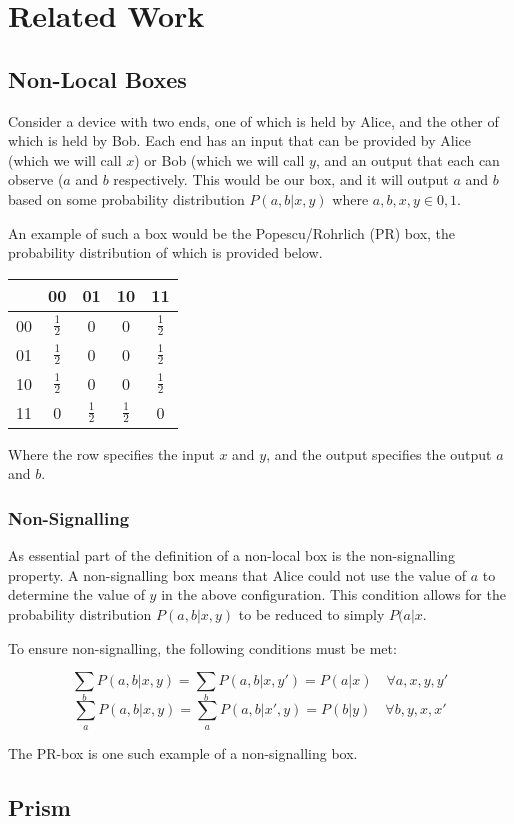 \documentclass[report.tex]{subfiles}
\begin{document}
\chapter{Related Work} %
\label{cha:related_work}
\section{Non-Local Boxes} %
\label{sec:non_local_boxes}
Consider a device with two ends, one of which is held by Alice, and the other of
which is held by Bob. Each end has an input that can be provided by Alice (which
we will call \(x\)) or Bob (which we will call \(y\), and an output that each
can observe (\(a\) and \(b\) respectively. This would be our box, and it will
output \(a\) and \(b\) based on some probability distribution \(P(a, b | x, y)\)
where \(a, b, x, y \in {0, 1}\).

An example of such a box would be the Popescu/Rohrlich (PR) box, the probability
distribution of which is provided below.

\begin{center}
\begin{tabular}{l | c c c c}
  & 00 & 01 & 10 & 11 \\
  \hline
  00 & \(\frac{1}{2}\) & 0 & 0 & \(\frac{1}{2}\) \\
  01 & \(\frac{1}{2}\) & 0 & 0 & \(\frac{1}{2}\) \\
  10 & \(\frac{1}{2}\) & 0 & 0 & \(\frac{1}{2}\) \\
  11 & 0 & \(\frac{1}{2}\) & \(\frac{1}{2}\) & 0 \\
\end{tabular}
\end{center}

Where the row specifies the input \(x\) and \(y\), and the output specifies the
output \(a\) and \(b\).

\subsection{Non-Signalling} %
\label{sub:non_signalling}
As essential part of the definition of a non-local box is the non-signalling
property. A non-signalling box means that Alice could not use the value of \(a\)
to determine the value of \(y\) in the above configuration. This condition
allows for the probability distribution \(P(a, b | x, y)\) to be reduced to
simply \(P(a|x\).

To ensure non-signalling, the following conditions must be met:

\[\sum_{b} P(a, b | x, y) = \sum_{b} P(a, b | x, y') = P(a | x) 
\quad \forall a, x, y, y'\]
\[\sum_{a} P(a, b | x, y) = \sum_{a} P(a, b | x', y) = P(b | y) 
\quad \forall b, y, x, x'\]

The PR-box is one such example of a non-signalling box.

\section{Prism} %
\label{sec:prism}


\newpage
\end{document}
